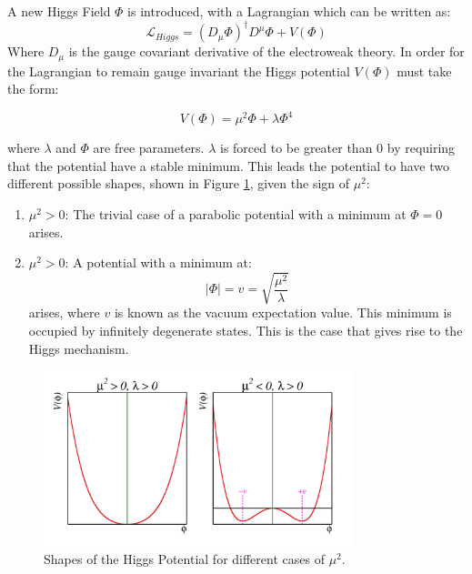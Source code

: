 A new Higgs Field $\Phi$ is introduced, with a Lagrangian which can be written as:
\begin{equation}
\mathcal{L}_{Higgs} = (D_{\mu}\Phi)^{\dagger}D^{\mu}\Phi + V(\Phi)
\end{equation}
Where $D_{\mu}$ is the gauge covariant derivative of the electroweak theory. In order for the Lagrangian to remain gauge invariant the Higgs potential $V(\Phi)$ must take the form:

\begin{equation}
    V(\Phi) = {\mu}^2{\Phi} + {\lambda}{\Phi}^4
\end{equation}

where $\lambda$ and $\Phi$ are free parameters. $\lambda$ is forced to be greater than 0 by requiring that the potential have a stable minimum. This leads the potential to have two different possible shapes, shown in Figure \ref{fig:higgspot}, given the sign of $\mu^2$:

\begin{enumerate}
    \item ${\mu^2 > 0}$: The trivial case of a parabolic potential with a minimum at $\Phi = 0$ arises.
    \item ${\mu^2 > 0}$: A potential with a minimum at:
    \begin{equation}
     |\Phi| = v = \sqrt{\frac{\mu^2}{\lambda}}
    \end{equation}
     arises, where $v$ is known as the vacuum expectation value. This minimum is occupied by infinitely degenerate states. This is the case that gives rise to the Higgs mechanism.
\end{enumerate}

\begin{figure}[h]
    \centering
    \includegraphics[width=0.8\textwidth]{Figures/1/HiggsPotential.png}
    \caption{Shapes of the Higgs Potential for different cases of $\mu^2$.}
    \label{fig:higgspot}
\end{figure}

